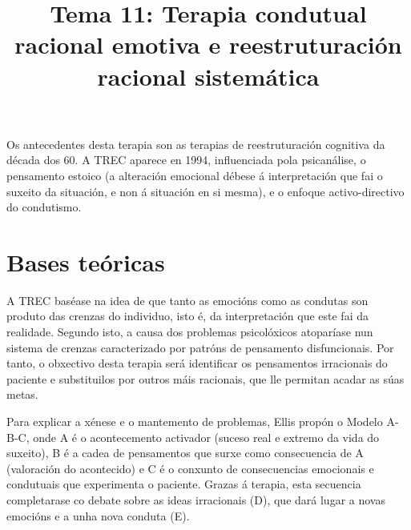 \documentclass[a4paper,11pt]{article}
\title{Tema 11: Terapia condutual racional emotiva e reestruturación racional sistemática}
\date{}
\begin{document}
   

\maketitle 

Os antecedentes desta terapia son as terapias de reestruturación cognitiva da década dos 60. A TREC aparece en 1994, influenciada pola psicanálise, o pensamento estoico (a alteración emocional débese á interpretación que fai o suxeito da situación, e non á situación en si mesma), e o enfoque activo-directivo do condutismo. 

\section{Bases teóricas}
A TREC baséase na idea de que tanto as emocións como as condutas son produto das crenzas do individuo, isto é, da interpretación que este fai da realidade. Segundo isto, a causa dos problemas psicolóxicos atoparíase nun sistema de crenzas caracterizado por patróns de pensamento disfuncionais. Por tanto, o obxectivo desta terapia será identificar os pensamentos irracionais do paciente e substituilos por outros máis racionais, que lle permitan acadar as súas metas. 

Para explicar a xénese e o mantemento de problemas, Ellis propón o Modelo A-B-C, onde A é o acontecemento activador (suceso real e extremo da vida do suxeito), B é a cadea de pensamentos que surxe como consecuencia de A (valoración do acontecido) e C é o conxunto de consecuencias emocionais e condutuais que experimenta o paciente. Grazas á terapia, esta secuencia completarase co debate sobre as ideas irracionais (D), que dará lugar a novas emocións e a unha nova conduta (E). 
\end{document}
